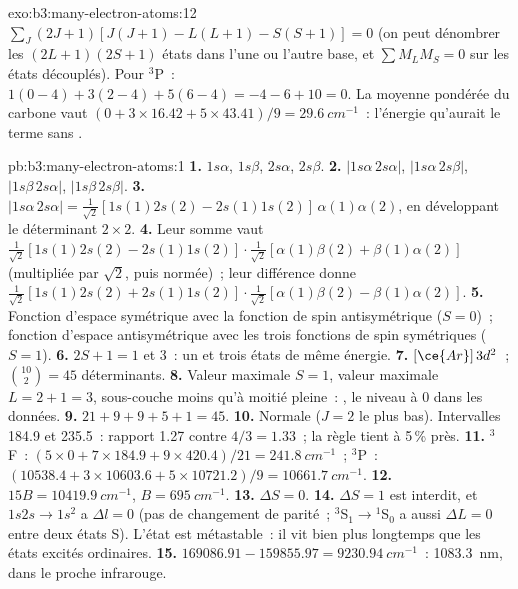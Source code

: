 \begin{solution}{exo:b3:many-electron-atoms:12}
$\sum_J(2J+1)[J(J+1) - L(L+1) - S(S+1)] = 0$ (on peut dénombrer les
$(2L+1)(2S+1)$ états dans l'une ou l'autre base, et $\sum M_LM_S = 0$ sur
les états découplés).
Pour ${}^3$P~: $1(0 - 4) + 3(2 - 4) + 5(6 - 4) = -4 - 6 + 10 = 0$. La
moyenne pondérée du carbone vaut $(0 + 3 \times 16.42 + 5 \times 43.41)/9 = \qty{29.6}{cm^{-1}}$~:
l'énergie qu'aurait le terme sans .
\end{solution}

\begin{solution}{pb:b3:many-electron-atoms:1}
\textbf{1.} $1s\alpha$, $1s\beta$, $2s\alpha$, $2s\beta$.
\textbf{2.} $|1s\alpha\,2s\alpha|$, $|1s\alpha\,2s\beta|$, $|1s\beta\,2s\alpha|$,
$|1s\beta\,2s\beta|$.
\textbf{3.} $|1s\alpha\,2s\alpha| = \frac{1}{\sqrt2}[1s(1)2s(2) - 2s(1)1s(2)]\,
\alpha(1)\alpha(2)$, en développant le déterminant $2\times2$.
\textbf{4.} Leur somme vaut $\frac{1}{\sqrt2}[1s(1)2s(2) - 2s(1)1s(2)]\cdot
\frac{1}{\sqrt2}[\alpha(1)\beta(2) + \beta(1)\alpha(2)]$ (multipliée par
$\sqrt2$, puis normée)~; leur différence donne $\frac{1}{\sqrt2}[1s(1)2s(2) +
2s(1)1s(2)]\cdot\frac{1}{\sqrt2}[\alpha(1)\beta(2) - \beta(1)\alpha(2)]$.
\textbf{5.} Fonction d'espace symétrique avec la fonction de spin
antisymétrique ($S = 0$)~;
fonction d'espace antisymétrique avec les trois fonctions de spin
symétriques ($S = 1$).
\textbf{6.} $2S + 1 = 1$ et 3~: un et trois états de même énergie.
\textbf{7.} $[\ce{Ar}]\,3d^2$~; $\binom{10}{2} = 45$ déterminants.
\textbf{8.} Valeur maximale $S = 1$, valeur maximale $L = 2 + 1 = 3$,
sous-couche moins qu'à moitié pleine~:
, le niveau à 0 dans les données.
\textbf{9.} $21 + 9 + 9 + 5 + 1 = 45$.
\textbf{10.} Normale ($J = 2$ le plus bas). Intervalles 184.9 et 235.5~:
rapport 1.27
contre $4/3 = 1.33$~; la règle tient à 5\,\% près.
\textbf{11.} ${}^3$F~: $(5 \times 0 + 7 \times 184.9 + 9 \times 420.4)/21 =
\qty{241.8}{cm^{-1}}$~; ${}^3$P~: $(10538.4 + 3 \times 10603.6 + 5 \times
10721.2)/9 = \qty{10661.7}{cm^{-1}}$.
\textbf{12.} $15B = \qty{10419.9}{cm^{-1}}$, $B = \qty{695}{cm^{-1}}$.
\textbf{13.} $\Delta S = 0$.
\textbf{14.} $\Delta S = 1$ est interdit, et $1s2s \to 1s^2$ a $\Delta l = 0$
(pas de changement de parité~; ${}^3$S$_1 \to {}^1$S$_0$ a aussi
$\Delta L = 0$ entre deux états S). L'état est métastable~: il vit bien
plus longtemps que les états excités ordinaires.
\textbf{15.} $169086.91 - 159855.97 = \qty{9230.94}{cm^{-1}}$~:
\qty{1083.3}{nm}, dans le proche infrarouge.

\end{solution}
